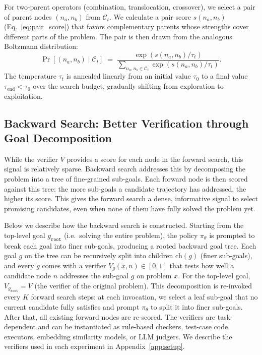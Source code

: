 \documentclass{llmxive}
\begin{document}
For two-parent operators (combination, translocation, crossover), we select a pair of parent nodes $(n_a, n_b)$ from $\mathcal{C}_t$.
We calculate a pair score $s(n_a, n_b)$ (Eq.~\ref{eq:pair_score}) that favors complementary parents whose strengths cover different parts of the problem.
The pair is then drawn from the analogous Boltzmann distribution:
\begin{equation}
  \Pr[(n_a, n_b) \mid \mathcal{C}_t]
   \;=\;\frac{\exp(s(n_a, n_b)/\tau_t)}
              {\sum_{n_a, n_b\in\mathcal{C}_t}\exp(s(n_a, n_b)/\tau_t)}.
        \label{eq:bi_boltz}
\end{equation}
The temperature $\tau_t$ is annealed linearly from an initial value
$\tau_0$ to a final value $\tau_{\mathrm{end}}<\tau_0$ over the search
budget, gradually shifting from exploration to exploitation.

\subsection{Backward Search: Better Verification through Goal Decomposition}
\label{sec:backward}

While the verifier $V$ provides a score for each node in the forward search, this signal is relatively sparse. Backward search addresses this by decomposing
the problem into a tree of fine-grained sub-goals. Each forward
node is then scored against this tree: the more sub-goals a
candidate trajectory has addressed, the higher its score.
This gives the forward search a dense, informative signal to
select promising candidates, even when none of them have fully
solved the problem yet. 

Below we describe how the backward search is constructed.
Starting from the top-level goal $g_{\texttt{root}}$ (i.e.\ solving the
entire problem), the policy $\pi_\theta$ is prompted
to break each goal into finer sub-goals, producing a rooted backward goal tree. Each goal $g$ on the tree can be recursively split into children
$\mathrm{ch}(g)$ (finer sub-goals), and every $g$ comes with a verifier
$V_g(x,n) \in [0,1]$ that tests
how well a candidate node $n$ addresses the sub-goal $g$ on
problem $x$. For the top-level goal, $V_{g_{\texttt{root}}} = V$ (the verifier of the original problem). 
This decomposition is re-invoked every $K$ forward
search steps: at each invocation, we select a leaf sub-goal that no current candidate fully satisfies and prompt $\pi_\theta$ to split it into finer sub-goals. After that, all existing forward nodes are re-scored. 
The verifiers are task-dependent and can be instantiated
as rule-based checkers, test-case code executors, embedding similarity
models, or LLM judgers. We describe the verifiers used in each experiment
in Appendix~\ref{app:setup}.
\end{document}
